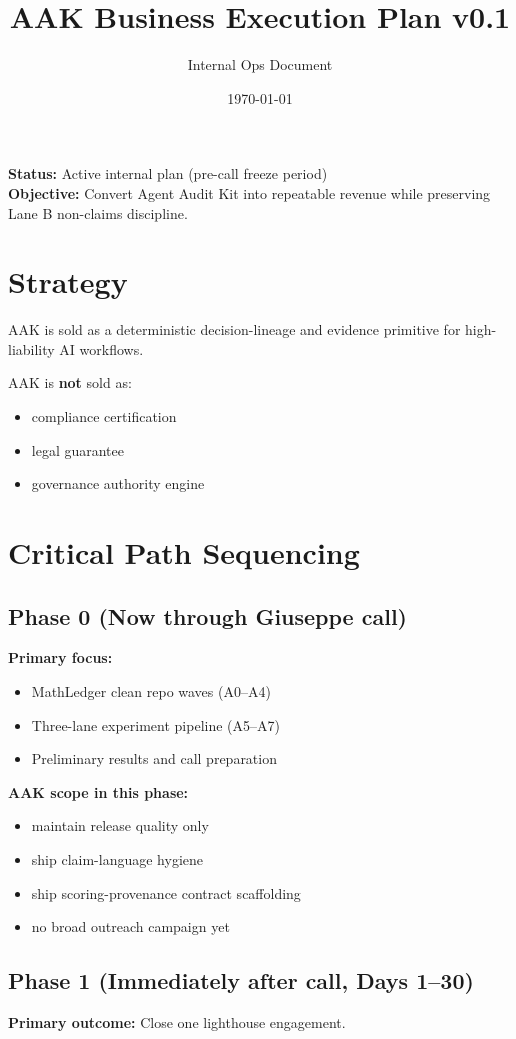 \documentclass[11pt]{article}
\title{\textbf{AAK Business Execution Plan v0.1}}
\author{Internal Ops Document}
\date{\today}
\begin{document}
\maketitle

\noindent\textbf{Status:} Active internal plan (pre-call freeze period)\\
\textbf{Objective:} Convert Agent Audit Kit into repeatable revenue while preserving Lane B non-claims discipline.

\section*{Strategy}
AAK is sold as a deterministic decision-lineage and evidence primitive for high-liability AI workflows.

\medskip
\noindent AAK is \textbf{not} sold as:
\begin{itemize}
  \item compliance certification
  \item legal guarantee
  \item governance authority engine
\end{itemize}

\section*{Critical Path Sequencing}
\subsection*{Phase 0 (Now through Giuseppe call)}
\textbf{Primary focus:}
\begin{itemize}
  \item MathLedger clean repo waves (A0--A4)
  \item Three-lane experiment pipeline (A5--A7)
  \item Preliminary results and call preparation
\end{itemize}

\textbf{AAK scope in this phase:}
\begin{itemize}
  \item maintain release quality only
  \item ship claim-language hygiene
  \item ship scoring-provenance contract scaffolding
  \item no broad outreach campaign yet
\end{itemize}

\subsection*{Phase 1 (Immediately after call, Days 1--30)}
\textbf{Primary outcome:} Close one lighthouse engagement.
\end{document}
